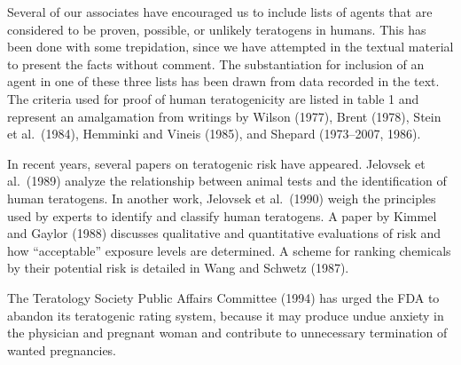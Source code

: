 \label{cfht}
\noindent
Several of our associates have encouraged us to include lists of
agents that are considered to be proven, possible,
or unlikely teratogens in humans. This has been
done with some trepidation, since we have attempted in the textual
material to present
the facts without comment. The substantiation for inclusion of an
agent in one of these
three lists has been drawn from data recorded in the text. The
criteria used for proof of human teratogenicity are listed in
table 1 and represent an amalgamation from writings by Wilson
(1977), Brent (1978), Stein et al.~(1984), Hemminki and Vineis
(1985), and Shepard (1973--2007, 1986).

In recent years, several papers on teratogenic risk have appeared.
Jelovsek et al.~(1989) analyze the relationship between animal tests
and the identification of human teratogens. In another work, Jelovsek
et al.~(1990) weigh the principles used by experts to identify and
classify human teratogens. A paper by Kimmel and Gaylor (1988)
discusses qualitative and quantitative evaluations of risk and how
``acceptable'' exposure levels are determined. A scheme for ranking
chemicals by their potential risk is detailed in Wang and
Schwetz (1987).

The Teratology Society Public Affairs Committee (1994)
has urged the FDA to abandon its teratogenic rating system,
because it may produce undue anxiety in the physician and pregnant 
woman and contribute to unnecessary termination of wanted pregnancies.

